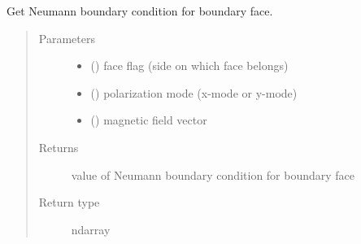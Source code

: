 \documentclass[letterpaper,10pt,english]{sphinxmanual}
\begin{document}

\begin{fulllineitems}
\label{\detokenize{petgem/hvfem:petgem.hvfem.getNeumannBCface}}
Get Neumann boundary condition for boundary face.
\begin{quote}\begin{description}
\item[{Parameters}] \leavevmode\begin{itemize}
\item {} 
 () \textendash{} face flag (side on which face belongs)

\item {} 
 () \textendash{} polarization mode (x-mode or y-mode)

\item {} 
 () \textendash{} magnetic field vector

\end{itemize}

\item[{Returns}] \leavevmode
value of Neumann boundary condition for boundary face

\item[{Return type}] \leavevmode
ndarray

\end{description}\end{quote}

\end{fulllineitems}

\end{document}

